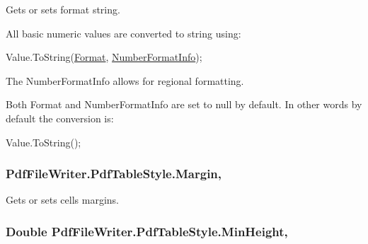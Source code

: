 Gets or sets format string. 

All basic numeric values are converted to string using\+: 


\begin{DoxyCode}
Value.ToString(\hyperlink{class_pdf_file_writer_1_1_pdf_table_style_af66d0e0252bfaf5f4ae226e43d70f093}{Format}, \hyperlink{class_pdf_file_writer_1_1_pdf_table_style_a2beb6ef95dd078268bb988549e999f8a}{NumberFormatInfo});
\end{DoxyCode}
 

The Number\+Format\+Info allows for regional formatting. 

Both Format and Number\+Format\+Info are set to null by default. In other words by default the conversion is\+: 


\begin{DoxyCode}
Value.ToString();
\end{DoxyCode}
\subsubsection[{\texorpdfstring{Margin}{Margin}}]{ Pdf\+File\+Writer.\+Pdf\+Table\+Style.\+Margin\hspace{0.3cm}{\ttfamily [get]}, {\ttfamily [set]}}\hypertarget{class_pdf_file_writer_1_1_pdf_table_style_a12c573207099707c86dba58f33b7dbd5}{}\label{class_pdf_file_writer_1_1_pdf_table_style_a12c573207099707c86dba58f33b7dbd5}


Gets or sets cell\textquotesingle{}s margins. 

\subsubsection[{\texorpdfstring{Min\+Height}{MinHeight}}]{\setlength{\rightskip}{0pt plus 5cm}Double Pdf\+File\+Writer.\+Pdf\+Table\+Style.\+Min\+Height\hspace{0.3cm}{\ttfamily [get]}, {\ttfamily [set]}}\hypertarget{class_pdf_file_writer_1_1_pdf_table_style_ae73d9fbcc9a57952bc117fa5621671de}{}\label{class_pdf_file_writer_1_1_pdf_table_style_ae73d9fbcc9a57952bc117fa5621671de}


